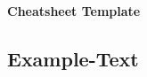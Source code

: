 \documentclass[a4paper ,landscape]{article}
\begin{document}
    \raggedright
    \footnotesize


    \begin{center}
        \Large{\textbf{Cheatsheet Template}}
    \end{center}

    \begin{multicols}{3}

        \section*{Example-Text}\label{sec:example-text}
        

    \end{multicols}
    \newpage

\end{document}
